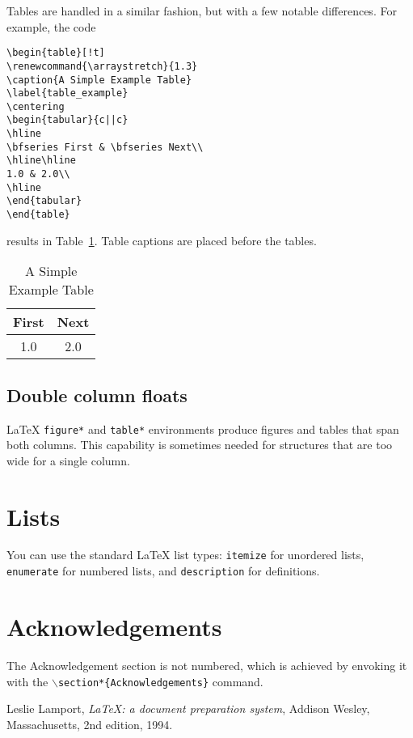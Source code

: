 \documentclass[10pt, conference,a4paper]{ITKproc}
\begin{document}
Tables are handled in a similar fashion, but with a few
notable differences. For example, the code

\begin{small}
\begin{verbatim}
\begin{table}[!t]
\renewcommand{\arraystretch}{1.3}
\caption{A Simple Example Table}
\label{table_example}
\centering
\begin{tabular}{c||c}
\hline
\bfseries First & \bfseries Next\\
\hline\hline
1.0 & 2.0\\
\hline
\end{tabular}
\end{table}
\end{verbatim}
\end{small}

results in Table~\ref{table_example}. Table captions are placed before the tables.

\begin{table}[!t]
\renewcommand{\arraystretch}{1.3}
\caption{A Simple Example Table}
\label{table_example}
\centering
\begin{tabular}{c||c}
\hline
\bfseries First & \bfseries Next\\
\hline\hline
1.0 & 2.0\\
\hline
\end{tabular}
\end{table}



\subsection{Double column floats}
{\LaTeX} \texttt{figure*} and \texttt{table*} environments produce figures
and tables that span both columns. This capability is
sometimes needed for structures that are too wide for a single
column.

\section{Lists}
You can use the standard {\LaTeX} list types: \texttt{itemize} for unordered lists, \texttt{enumerate} for numbered lists, and  \texttt{description} for definitions.

\section*{Acknowledgements}
The Acknowledgement section is not numbered, which is achieved by envoking it with the \texttt{$\backslash$section*\{Acknowledgements\}} command.



%
\begin{thebibliography}{9}

  Leslie Lamport,
  \emph{{\LaTeX}: a document preparation system},
  Addison Wesley, Massachusetts,
  2nd edition,
  1994.

\end{thebibliography}

\end{document}
